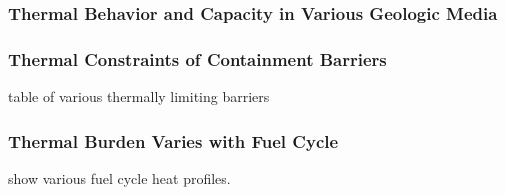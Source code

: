 


\begin{frame}[ctb!]
  \frametitle{Thermal Behavior and Capacity in Various Geologic Media}
\footnotesize{
  
}
\end{frame}



\begin{frame}[ctb!]
  \frametitle{Thermal Constraints of Containment Barriers} 
\footnotesize{
  table of various thermally limiting barriers
}
\end{frame}



\begin{frame}[ctb!]
  \frametitle{Thermal Burden Varies with Fuel Cycle}
\footnotesize{
  show various fuel cycle heat profiles.
}
\end{frame}



